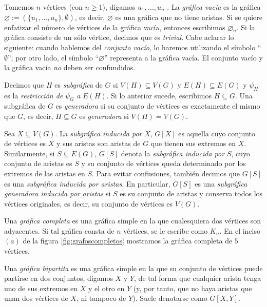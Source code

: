 Tomemos $n$ vértices (con $n\geq 1$), digamos $u_{1}, \ldots, u_{n}$ . La \textit{gráfica vacía} es la gráfica $\varnothing := (\{u_{1}, \ldots, u_{n}\}, \emptyset)$, es decir, $\varnothing$ es una gráfica que no tiene aristas. Si se quiere enfatizar el número de vértices de la gráfica vacía, entonces escribimos $\varnothing_{n}$. Si la gráfica consiste de un sólo vértice, decimos que es \textit{trivial}. Cabe aclarar lo siguiente: cuando hablemos del \textit{conjunto vacío}, lo haremos utilizando el símbolo ``$\emptyset$''; por otro lado, el símbolo ``$\varnothing$'' representa a la gráfica vacía. El conjunto vacío y la gráfica vacía \textit{no} deben ser confundidos.

Decimos que $H$ es \textit{subgráfica}  de $G$ si $V(H) \subseteq V(G)$ y $E(H) \subseteq E(G)$ y $\psi_{H}$ es la \textit{restricción de} $\psi_{G}$ \textit{a} $E(H)$. Si lo anterior sucede, escribimos $H \subseteq G$. Una subgráfica de $G$ es \textit{generadora}  si su conjunto de vértices es exactamente el mismo que $G$, es decir, $H \subseteq G$ es \textit{generadora} si $V(H)=V(G)$.

Sea $X \subseteq V(G)$. La \textit{subgráfica inducida por}  $X$, $G[X]$ es aquella cuyo conjunto de vértices es $X$ y sus aristas son aristas de $G$ que tienen sus extremos en $X$. Similarmente, si $S\subseteq E(G)$, $G[S]$ denota la \textit{subgráfica inducida por} $S$, cuyo conjunto de aristas es $S$ y su conjunto de vértices queda determinado por los extremos de las aristas en $S$. Para evitar confusiones, también decimos que $G[S]$ es una \textit{subgráfica inducida por aristas}. En particular, $G[S]$ es una \textit{subgráfica generadora inducida por aristas} si $S$ es su conjunto de aristas y conserva todos los vértices originales, es decir, su conjunto de vértices es $V(G)$.

Una \textit{gráfica completa} es una gráfica simple en la que cualesquiera dos vértices son adyacentes. Si tal gráfica consta de $n$ vértices, se le escribe como $K_{n}$. En el inciso $(a)$ de la figura \ref{fig:grafoscompletos} mostramos la gráfica completa de $5$ vértices.

Una \textit{gráfica bipartita} es una gráfica simple en la que su conjunto de vértices puede partirse en dos conjuntos, digamos $X$ y $Y$, de tal forma que cualquier arista tenga uno de sus extremos en $X$ y el otro en $Y$ (y, por tanto, que no haya aristas que unan dos vértices de $X$, ni tampoco de $Y$). Suele denotarse como $G[X,Y]$. 

